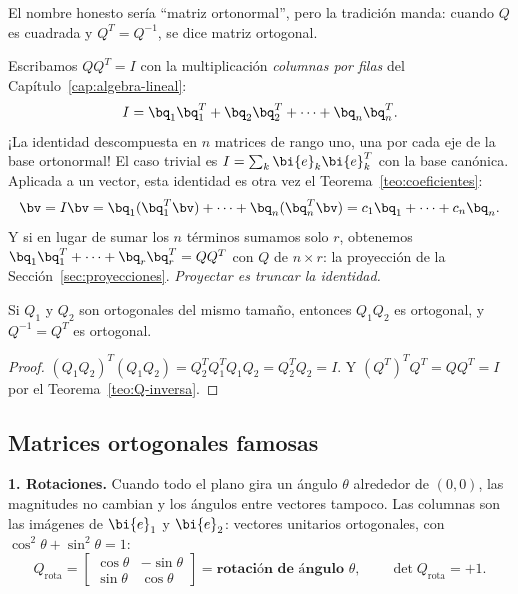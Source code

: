 \begin{observacion}
El nombre honesto sería ``matriz ortonormal'', pero la tradición manda:
cuando $Q$ es cuadrada y $Q^T=Q^{-1}$, se dice matriz ortogonal.
\end{observacion}

\begin{observacion}
\label{obs:identidad-rango-uno}
Escribamos $QQ^T=I$ con la multiplicación
\emph{columnas por filas} del Capítulo~\ref{cap:algebra-lineal}:
\[
I=\bq_1\bq_1^T+\bq_2\bq_2^T+\cdots+\bq_n\bq_n^T .
\]
¡La identidad descompuesta en $n$ matrices de rango uno, una por cada eje
de la base ortonormal! El caso trivial es
$I=\sum_k\bi{e}_k\bi{e}_k^T$ con la base canónica. Aplicada a un
vector, esta identidad es otra vez el Teorema~\ref{teo:coeficientes}:
\[
\bv=I\bv=\bq_1(\bq_1^T\bv)+\cdots+\bq_n(\bq_n^T\bv)
=c_1\bq_1+\cdots+c_n\bq_n .
\]
Y si en lugar de sumar los $n$ términos sumamos solo $r$, obtenemos
$\bq_1\bq_1^T+\cdots+\bq_r\bq_r^T=QQ^T$ con $Q$ de
$n\times r$: la proyección de la Sección~\ref{sec:proyecciones}.
\emph{Proyectar es truncar la identidad.}
\end{observacion}

\begin{proposicion}\label{prop:productos}
Si $Q_1$ y $Q_2$ son ortogonales del mismo tamaño, entonces $Q_1Q_2$ es
ortogonal, y $Q^{-1}=Q^T$ es ortogonal.
\end{proposicion}

\begin{proof}
$(Q_1Q_2)^T(Q_1Q_2)=Q_2^T Q_1^T Q_1Q_2=Q_2^T Q_2=I$.
Y $(Q^T)^T Q^T=QQ^T=I$ por el
Teorema~\ref{teo:Q-inversa}.
\end{proof}

\subsection*{Matrices ortogonales famosas}

\textbf{1. Rotaciones.} Cuando todo el plano gira un ángulo $\theta$
alrededor de $(0,0)$, las magnitudes no cambian y los ángulos entre vectores
tampoco. Las columnas son las imágenes de $\bi{e}_1$ y $\bi{e}_2$: vectores
unitarios ortogonales, con $\cos^2\theta+\sin^2\theta=1$:
\begin{equation}\label{eq:rotacion}
Q_{\text{rota}}=\begin{bmatrix}\cos\theta&-\sin\theta\\
\sin\theta&\cos\theta\end{bmatrix}
=\textbf{rotación de ángulo } \theta,
\qquad \det Q_{\text{rota}}=+1 .
\end{equation}

